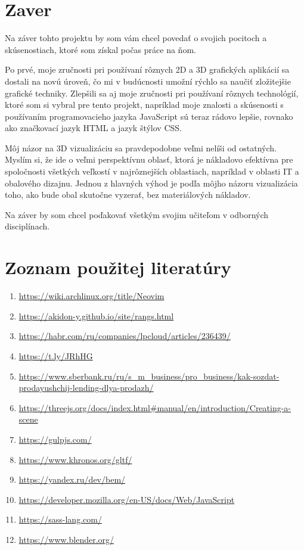   \newpage
  \section{Zaver}
Na záver tohto projektu by som vám chcel povedať o svojich pocitoch a skúsenostiach, ktoré som získal počas práce na ňom.

Po prvé, moje zručnosti pri používaní rôznych 2D a 3D grafických aplikácií sa dostali na novú úroveň, čo mi v budúcnosti umožní rýchlo sa naučiť zložitejšie grafické techniky. Zlepšili sa aj moje zručnosti pri používaní rôznych technológií, ktoré som si vybral pre tento projekt, napríklad moje znalosti a skúsenosti s používaním programovacieho jazyka JavaScript sú teraz rádovo lepšie, rovnako ako značkovací jazyk HTML a jazyk štýlov CSS.

Môj názor na 3D vizualizáciu sa pravdepodobne veľmi nelíši od ostatných. Myslím si, že ide o veľmi perspektívnu oblasť, ktorá je nákladovo efektívna pre spoločnosti všetkých veľkostí v najrôznejších oblastiach, napríklad v oblasti IT a obalového dizajnu.  Jednou z hlavných výhod je podľa môjho názoru vizualizácia toho, ako bude obal skutočne vyzerať, bez materiálových nákladov.

Na záver by som chcel poďakovať všetkým svojim učiteľom v odborných disciplínach.
  \newpage
  \section{Zoznam použitej literatúry}

    \begin{enumerate}
      \item{\url{https://wiki.archlinux.org/title/Neovim}}
      \item{\url{https://akidon-y.github.io/site/rangs.html}}
      \item{\url{https://habr.com/ru/companies/lpcloud/articles/236439/}}
      \item{\url{https://t.ly/JRhHG}}
      \item{\url{https://www.sberbank.ru/ru/s_m_business/pro_business/kak-sozdat-prodayushchij-lending-dlya-prodazh/}}
      \item{\url{https://threejs.org/docs/index.html#manual/en/introduction/Creating-a-scene}}
      \item{\url{https://gulpjs.com/}}
      \item{\url{https://www.khronos.org/gltf/}}
      \item{\url{https://yandex.ru/dev/bem/}}
      \item{\url{https://developer.mozilla.org/en-US/docs/Web/JavaScript}}
      \item{\url{https://sass-lang.com/}}
      \item{\url{https://www.blender.org/}}
    \end{enumerate}

